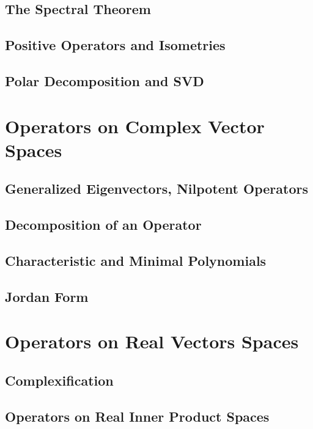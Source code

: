 \documentclass[11pt, letterpaper]{article}
\begin{document}
\newpage
\subsection{The Spectral Theorem}

\newpage
\subsection{Positive Operators and Isometries}

\newpage
\subsection{Polar Decomposition and SVD}

\newpage
\section{Operators on Complex Vector Spaces}
\subsection{Generalized Eigenvectors, Nilpotent Operators}

\newpage
\subsection{Decomposition of an Operator}

\newpage
\subsection{Characteristic and Minimal Polynomials}

\newpage
\subsection{Jordan Form}

\newpage
\section{Operators on Real Vectors Spaces}
\subsection{Complexification}

\newpage
\subsection{Operators on Real Inner Product Spaces}
\end{document}
